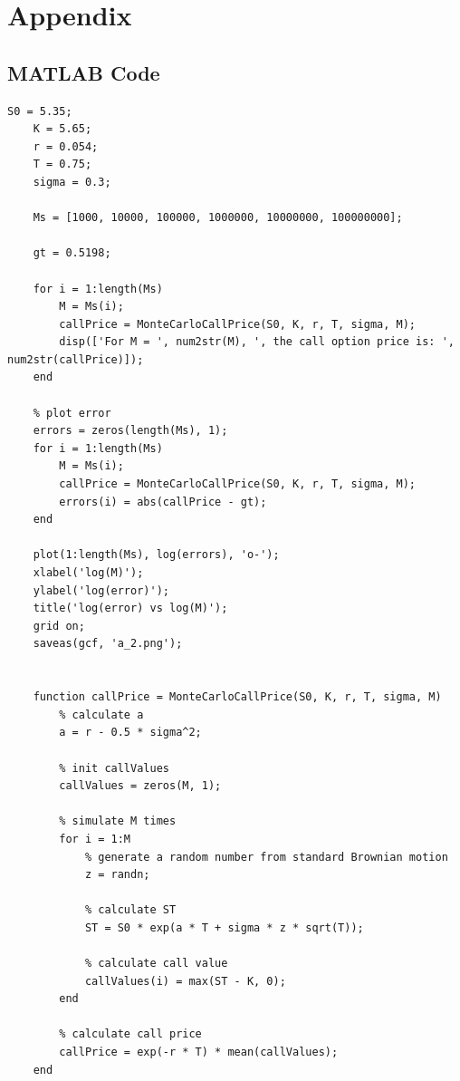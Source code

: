 \documentclass[12pt]{article}
\begin{document}
\clearpage
\appendix
\section*{Appendix}
\renewcommand{\thesubsection}{\Alph{subsection}}

\subsection{MATLAB Code}

\begin{lstlisting}[label=lst:a2,
    caption=Question a)ii)]
    S0 = 5.35; 
    K = 5.65; 
    r = 0.054; 
    T = 0.75; 
    sigma = 0.3; 
    
    Ms = [1000, 10000, 100000, 1000000, 10000000, 100000000];
    
    gt = 0.5198;
    
    for i = 1:length(Ms)
        M = Ms(i);
        callPrice = MonteCarloCallPrice(S0, K, r, T, sigma, M);
        disp(['For M = ', num2str(M), ', the call option price is: ', num2str(callPrice)]);
    end
    
    % plot error
    errors = zeros(length(Ms), 1);
    for i = 1:length(Ms)
        M = Ms(i);
        callPrice = MonteCarloCallPrice(S0, K, r, T, sigma, M);
        errors(i) = abs(callPrice - gt);
    end
    
    plot(1:length(Ms), log(errors), 'o-');
    xlabel('log(M)');
    ylabel('log(error)');
    title('log(error) vs log(M)');
    grid on;
    saveas(gcf, 'a_2.png');
    
    
    function callPrice = MonteCarloCallPrice(S0, K, r, T, sigma, M)
        % calculate a
        a = r - 0.5 * sigma^2;
        
        % init callValues
        callValues = zeros(M, 1);
        
        % simulate M times
        for i = 1:M
            % generate a random number from standard Brownian motion
            z = randn;
            
            % calculate ST
            ST = S0 * exp(a * T + sigma * z * sqrt(T));
            
            % calculate call value
            callValues(i) = max(ST - K, 0);
        end
        
        % calculate call price 
        callPrice = exp(-r * T) * mean(callValues);
    end
    
\end{lstlisting}
\end{document}
